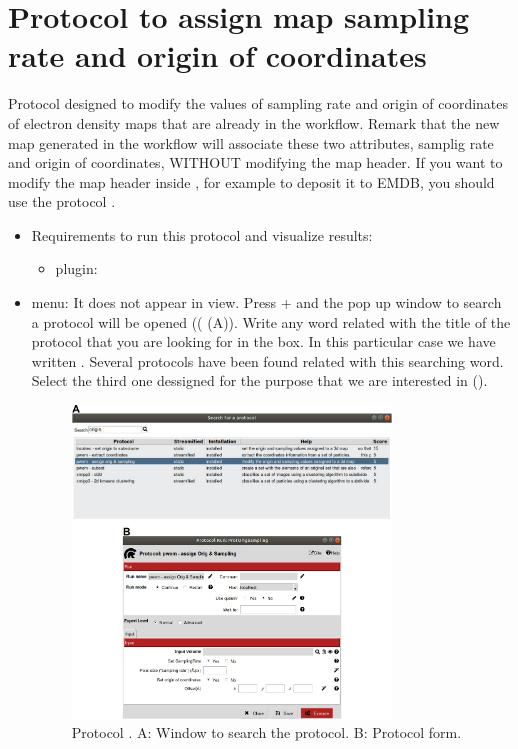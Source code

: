 \section{Protocol to assign map sampling rate and origin of coordinates}
\label{app:asignOrigAndSampling}%

Protocol designed to modify the values of sampling rate and origin of coordinates of electron density maps that are already in the \scipion workflow. Remark that the new map generated in the \scipion workflow will associate these two attributes, samplig rate and origin of coordinates, WITHOUT modifying the map header. If you want to modify the map header inside \scipion, for example to deposit it to EMDB, you should use the protocol .
   
 \begin{itemize}
  \item Requirements to run this protocol and visualize results:
    \begin{itemize}
        \item \scipion plugin: 
    \end{itemize}
  \item \scipion menu:
  It does not appear in  view.
  Press  +  and the pop up window to search a protocol will be opened (( (A)). Write any word related with the title of the protocol that you are looking for in the  box. In this particular case we have written . Several protocols have been found related with this searching word. Select the third one dessigned for the purpose that we are interested in ().
  
    \begin{figure}[H]
    \centering 
    \captionsetup{width=.9\linewidth} 
    \includegraphics[width=0.80\textwidth]{Images_appendix/Fig301.pdf}
    \caption{Protocol . A: Window to search the protocol. B: Protocol form.}
    \label{fig:app_protocol_assign_orig_and_sampling}
   \end{figure}
  

\end{itemize}
